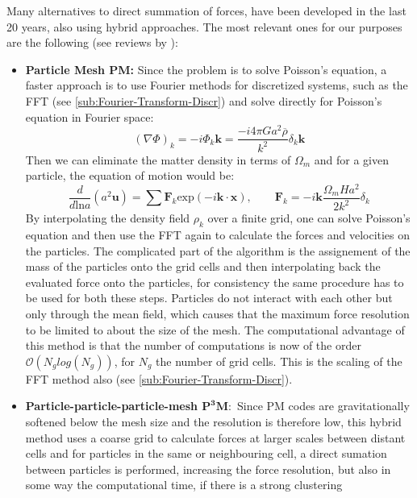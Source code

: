 Many alternatives to direct summation of forces, have been developed
in the last 20 years, also using hybrid approaches. The most relevant
ones for our purposes are the following (see reviews by \citet{trenti_gravitational_2008,dehnen_n-body_2011,kuhlen_numerical_2012}):
\begin{itemize}
\item \textbf{Particle Mesh PM: }Since the problem is to solve Poisson's
equation, a faster approach is to use Fourier methods for discretized
systems, such as the FFT (see \ref{sub:Fourier-Transform-Discr})
 and solve directly for Poisson's equation in Fourier space: 
\begin{equation}
(\nabla\Phi)_{k}=-i\Phi_{k}\mathbf{k}=\frac{-i4\pi Ga^{2}\overline{\rho}}{k^{2}}\delta_{k}\mathbf{k}
\end{equation}
Then we can eliminate the matter density in terms of $\Omega_{m}$
and for a given particle, the equation of motion would be: 
\begin{equation}
\frac{d}{d\mbox{ln}a}(a^{2}\mathbf{u})=\sum\mathbf{F}_{k}\mbox{exp}(-i\mathbf{k}\cdot\mathbf{x}),\qquad\mathbf{F}_{k}=-i\mathbf{k}\frac{\Omega_{m}Ha^{2}}{2k^{2}}\delta_{k}
\end{equation}
By interpolating the density field $\rho_{k}$ over a finite grid,
one can solve Poisson's equation and then use the FFT again to calculate
the forces and velocities on the particles. The complicated part of
the algorithm is the assignement of the mass of the particles onto
the grid cells and then interpolating back the evaluated force onto
the particles, for consistency the same procedure has to be used for
both these steps. Particles do not interact with each other but only
through the mean field, which causes that the maximum force resolution
to be limited to about the size of the mesh. The computational advantage
of this method is that the number of computations is now of the order
$\mathcal{O}(N_{g}log(N_{g}))$, for $N_{g}$ the number of grid cells.
This is the scaling of the FFT method also (see \ref{sub:Fourier-Transform-Discr}).
\item \textbf{Particle-particle-particle-mesh $\mathbf{P^{3}M}:$ }Since
PM codes are gravitationally softened below the mesh size and the
resolution is therefore low, this hybrid method uses a coarse grid
to calculate forces at larger scales between distant cells and for
particles in the same or neighbouring cell, a direct sumation between
particles is performed, increasing the force resolution, but also
in some way the computational time, if there is a strong clustering

\end{itemize}

